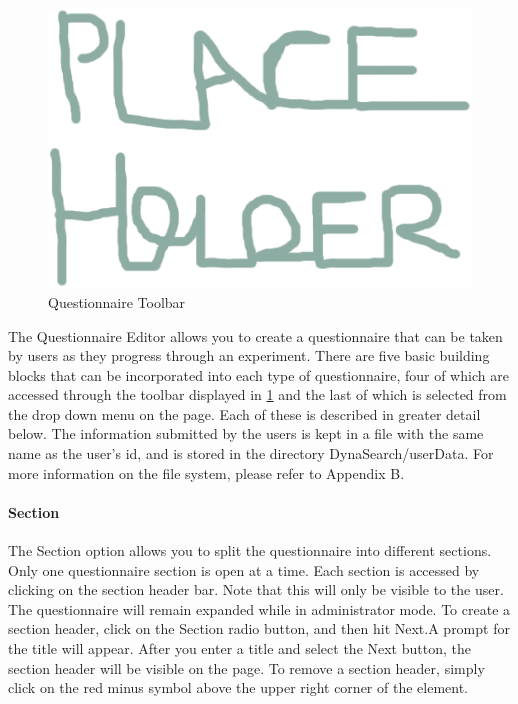 \documentclass[article]{ij4uq}              %
\begin{document}
\begin{figure}[h!]
 \centering
 \includegraphics[width=5.0in]{figures/place.eps}
 \caption{Questionnaire Toolbar}
 \label{fig:questTool}
\end{figure}
\FloatBarrier

The Questionnaire Editor allows you to create a questionnaire that can be taken by users as they progress through an experiment. There are five basic building blocks that can be incorporated into each type of questionnaire, four of which are accessed through the toolbar displayed in \ref{fig:questTool} and the last of which is selected from the drop down menu on the page. Each of these is described in greater detail below. 
The information submitted by the users is kept in a file with the same name as the user's id, and is stored in the directory DynaSearch/userData. For more information on the file system, please refer to Appendix B.

\paragraph{Section}

The Section option allows you to split the questionnaire into different sections. Only one questionnaire section is open at a time. Each section is accessed by clicking on the section header bar. Note that this will only be visible to the user. The questionnaire will remain expanded while in administrator mode. 
To create a section header, click on the Section radio button, and then hit Next.A prompt for the title will appear. After you enter a title and select the Next button, the section header will be visible on the page. To remove a section header, simply click on the red minus symbol above the upper right corner of the element.
\end{document}
